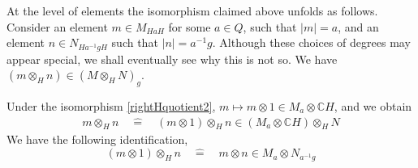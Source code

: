 \documentclass[11pt]{book}
\theoremstyle{Rem}
\theoremstyle{definition}
\numberwithin{equation}{section}
\newcommand\identify{\quad\hat{=}\quad}
\newcommand\inv{^{-1}}
\newcommand\ot{\otimes}
\newcommand\CC{\mathbb C}
\begin{document}
At the level of elements the isomorphism claimed above unfolds as follows. Consider  an element $m\in M_{HaH}$ for some $a\in Q$, such that $|m| = a$, and an element $n\in N_{Ha\inv g H}$ such that $|n| = a\inv g$. Although these choices of degrees may appear special, we shall eventually see why this is not so.
We have $ (m\otimes_H n) \in (M\otimes_H N)_g$. 


Under the isomorphism \ref{rightHquotient2}, $m \mapsto m\otimes 1 \in M_a \otimes \CC H$, and we obtain
\begin{align}\label{H-tensorprod}
m\otimes_H n \identify (m \otimes 1) \otimes_H n \in (M_a\otimes \CC H) \otimes_H N
\end{align}
We have the following identification, 
\begin{equation}
	(m \otimes 1) \otimes_H n \identify m \otimes  n \in M_a \ot N_{a\inv g}
\end{equation}
\end{document}
